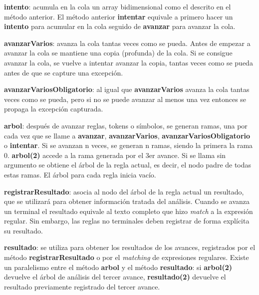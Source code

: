 \documentclass{report}
\begin{document}
	\vspace{10px}
	\noindent
	\textbf{intento}: acumula en la cola un array bidimensional como el descrito en el método anterior. El método anterior \textbf{intentar} equivale a primero hacer un \textbf{intento} para acumular en la cola seguido de \textbf{avanzar} para avanzar la cola.
	
	\vspace{10px}
	\noindent
	\textbf{avanzarVarios}: avanza la cola tantas veces como se pueda. Antes de empezar a avanzar la cola se mantiene una copia (profunda) de la cola. Si se consigue avanzar la cola, se vuelve a intentar avanzar la copia, tantas veces como se pueda antes de que se capture una excepción.   
	
	\vspace{10px}
	\noindent
	\textbf{avanzarVariosObligatorio}: al igual que \textbf{avanzarVarios} avanza la cola tantas veces como se pueda, pero si no se puede avanzar al menos una vez entonces se propaga la excepción capturada.
	
	\vspace{10px}
	\noindent
	\textbf{arbol}: después de avanzar reglas, tokens o símbolos, se generan ramas, una por cada vez que se llame a \textbf{avanzar}, \textbf{avanzarVarios}, \textbf{avanzarVariosObligatorio} o \textbf{intentar}. Si se avanzan n veces, se generan n ramas, siendo la primera la rama 0. \textbf{arbol(2)} accede a la rama generada por el 3er avance. Si se llama sin argumento se obtiene el árbol de la regla actual, es decir, el nodo padre de todas estas ramas. El árbol para cada regla inicia vacío.
	
	\vspace{10px}
	\noindent
	\textbf{registrarResultado}: asocia al nodo del árbol de la regla actual un resultado, que se utilizará para obtener información tratada del análisis. Cuando se avanza un terminal el resultado equivale al texto completo que hizo \textit{match} a la expresión regular. Sin embargo, las reglas no terminales deben registrar de forma explícita su resultado. 
	
	\vspace{10px}
	\noindent
	\textbf{resultado}: se utiliza para obtener los resultados de los avances, registrados por el método \textbf{registrarResultado} o por el \textit{matching} de expresiones regulares. Existe un paralelismo entre el método \textbf{arbol} y el método \textbf{resultado}: si \textbf{arbol(2)} devuelve el árbol de análisis del tercer avance, \textbf{resultado(2)} devuelve el resultado previamente registrado del tercer avance.
\end{document}
